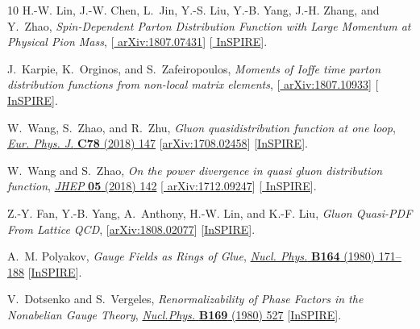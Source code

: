 \begin{thebibliography}{10}
H.-W. Lin, J.-W. Chen, L.~Jin, Y.-S. Liu, Y.-B. Yang, J.-H. Zhang, and Y.~Zhao,
{\it {Spin-Dependent Parton Distribution Function with Large Momentum at
  Physical Pion Mass}},  [\href{http://arxiv.org/abs/1807.07431}{{\ttfamily
  arXiv:1807.07431}}] [\href{http://inspirehep.net/record/1683262}{{\ttfamily
  InSPIRE}}].

J.~Karpie, K.~Orginos, and S.~Zafeiropoulos,
{\it {Moments of Ioffe time parton distribution functions from non-local matrix
  elements}},  [\href{http://arxiv.org/abs/1807.10933}{{\ttfamily
  arXiv:1807.10933}}] [\href{http://inspirehep.net/record/1684322}{{\ttfamily
  InSPIRE}}].

W.~Wang, S.~Zhao, and R.~Zhu, {\it {Gluon quasidistribution function at one
  loop}},
\href{http://dx.doi.org/10.1140/epjc/s10052-018-5617-3}{{\em Eur. Phys. J.}
  {\bfseries C78} (2018) 147}
  [\href{http://arxiv.org/abs/1708.02458}{{\ttfamily arXiv:1708.02458}}]
  [\href{http://inspirehep.net/record/1614777}{{\ttfamily InSPIRE}}].

W.~Wang and S.~Zhao, {\it {On the power divergence in quasi gluon distribution
  function}},
\href{http://dx.doi.org/10.1007/JHEP05(2018)142}{{\em JHEP} {\bfseries 05}
  (2018) 142} [\href{http://arxiv.org/abs/1712.09247}{{\ttfamily
  arXiv:1712.09247}}] [\href{http://inspirehep.net/record/1644909}{{\ttfamily
  InSPIRE}}].

Z.-Y. Fan, Y.-B. Yang, A.~Anthony, H.-W. Lin, and K.-F. Liu,
{\it {Gluon Quasi-PDF From Lattice QCD}},
  [\href{http://arxiv.org/abs/1808.02077}{{\ttfamily arXiv:1808.02077}}]
  [\href{http://inspirehep.net/record/1685340}{{\ttfamily InSPIRE}}].

A.~M. Polyakov, {\it {Gauge Fields as Rings of Glue}},
\href{http://dx.doi.org/10.1016/0550-3213(80)90507-6}{{\em Nucl. Phys.}
  {\bfseries B164} (1980) 171--188}
  [\href{http://inspirehep.net/record/157352}{{\ttfamily InSPIRE}}].

V.~Dotsenko and S.~Vergeles, {\it {Renormalizability of Phase Factors in the
  Nonabelian Gauge Theory}},
\href{http://dx.doi.org/10.1016/0550-3213(80)90103-0}{{\em Nucl.Phys.}
  {\bfseries B169} (1980) 527}
  [\href{http://inspirehep.net/record/144525}{{\ttfamily InSPIRE}}].


\end{thebibliography}
